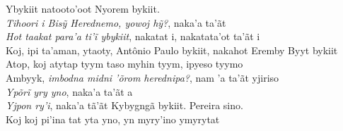 \bigskip

\begin{linenumbers}\begingroup\raggedright

\noindent   Ybykiit natooto'oot Nyorem bykiit.\\
  \emph{Tihoori i Bisỹ Herednemo, yowoj hỹ?}, naka’a ta’ãt\\
  \emph{Hot taakat para’a ti’ĩ ybykiit}, nakatat i, nakatata’ot ta’ãt i\\
  Koj, ipi ta'aman, ytaoty, Antônio Paulo bykiit, nakahot Eremby Byyt bykiit\\
  Atop, koj atytap tyym taso myhin tyym, ipyeso tyymo\\
  Ambyyk, \emph{imbodna midni 'õrom herednipa?}, nam 'a ta'ãt yjiriso\\
  \emph{Ypõrĩ yry yno}, naka’a ta’ãt a\\
  \emph{Yjpon ry'i}, naka'a tã'ãt Kybygngã bykiit. Pereira sino.\\
  Koj koj pi'ina tat yta yno, yn myry'ino ymyrytat

\end{linenumbers}\endgroup

\bigskip

